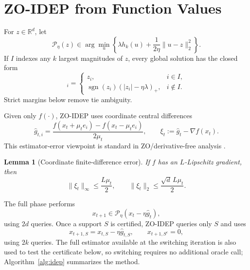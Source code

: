 \documentclass{article}
\newtheorem{lemma}{Lemma}
\newcommand{\R}{\mathbb{R}}
\newcommand{\Peta}{\mathcal{P}_{\eta}}
\begin{document}
\section{ZO-IDEP from Function Values}
For $z\in\R^d$, let
\begin{equation}
\Peta(z)\in\arg\min_u\left\{\lambda h_k(u)+\frac{1}{2\eta}\|u-z\|_2^2\right\}.
\label{eq:proxmap}
\end{equation}
If $I$ indexes any $k$ largest magnitudes of $z$, every global solution has the closed form \cite{zhao2026exact}
\begin{equation}
[\Peta(z)]_i=
\begin{cases}
 z_i, & i\in I,\\
 \operatorname{sgn}(z_i)(|z_i|-\eta\lambda)_+, & i\notin I.
\end{cases}
\label{eq:proxclosed}
\end{equation}
Strict margins below remove tie ambiguity.

Given only $f(\cdot)$, ZO-IDEP uses coordinate central differences
\begin{equation}
\widehat g_{t,i}=\frac{f(x_t+\mu_t e_i)-f(x_t-\mu_t e_i)}{2\mu_t},\qquad
\xi_t:=\widehat g_t-\nabla f(x_t).
\label{eq:coordzo}
\end{equation}
This estimator-error viewpoint is standard in ZO/derivative-free analysis \cite{berahas2022comparison,ghadimi2013stochastic}.

\begin{lemma}[Coordinate finite-difference error]\label{lem:fd}
If $f$ has an $L$-Lipschitz gradient, then
\begin{equation}
 \|\xi_t\|_\infty\le \frac{L\mu_t}{2},\qquad
 \|\xi_t\|_2\le \frac{\sqrt d\,L\mu_t}{2}.
 \label{eq:zoerror}
\end{equation}
\end{lemma}
\noindent The full phase performs
\begin{equation}
 x_{t+1}\in\Peta(x_t-\eta\widehat g_t),
 \label{eq:update}
\end{equation}
using $2d$ queries. Once a support $S$ is certified, ZO-IDEP queries only $S$ and uses
\begin{equation}
 x_{t+1,S}=x_{t,S}-\eta\widehat g_{t,S},\qquad x_{t+1,S^c}=0,
 \label{eq:restrictedupdate}
\end{equation}
using $2k$ queries. The full estimator available at the switching iteration is also used to test the certificate below, so switching requires no additional oracle call; Algorithm~\ref{alg:idep} summarizes the method.
\end{document}
